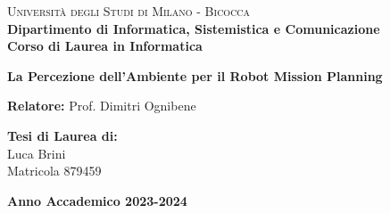 


\begin{titlepage}

    \noindent
    \begin{minipage}[t]{0.19\textwidth}
    \end{minipage}
    \hspace{2mm}
    \begin{minipage}[t]{0.70\textwidth}
        {
            {\textsc{Università degli Studi di Milano - Bicocca}} \\
            \textbf{Dipartimento di Informatica, Sistemistica e Comunicazione} \\
            \textbf{Corso di Laurea in Informatica} \\
            \par
        }
    \end{minipage}

    \vspace{40mm}

    \begin{center}
        {\LARGE{
                \textbf{La Percezione dell'Ambiente per il Robot Mission Planning}
                \par
            }}
    \end{center}

    \vspace{50mm}

    \noindent
    {\large \textbf{Relatore:} Prof. Dimitri Ognibene } \\

    \vspace{15mm}

    \begin{flushright}
        {\large \textbf{Tesi di Laurea di:}} \\
        \large{Luca Brini} \\
        \large{Matricola 879459}
    \end{flushright}

    \vspace{20mm}
    \begin{center}
        {\large{\bf Anno Accademico 2023-2024}}
    \end{center}


\end{titlepage}

